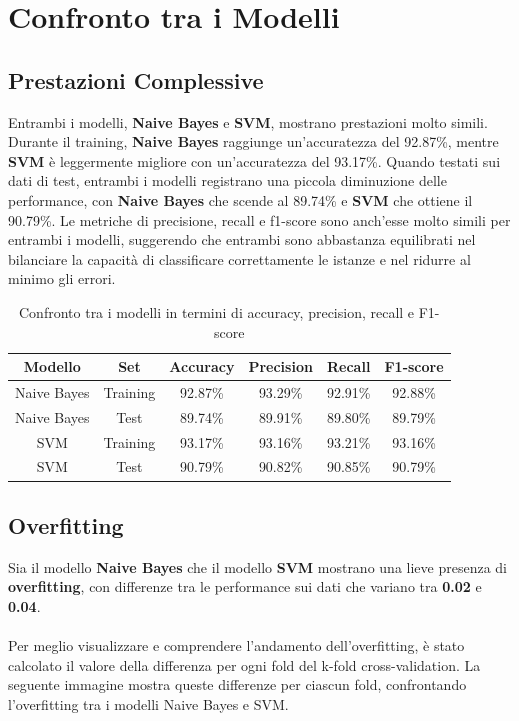 \section{Confronto tra i Modelli}

\subsection{Prestazioni Complessive}

Entrambi i modelli, \textbf{Naive Bayes} e \textbf{SVM}, mostrano prestazioni molto simili. Durante il training, \textbf{Naive Bayes} raggiunge un'accuratezza del 92.87\%, mentre \textbf{SVM} è leggermente migliore con un'accuratezza del 93.17\%. Quando testati sui dati di test, entrambi i modelli registrano una piccola diminuzione delle performance, con \textbf{Naive Bayes} che scende al 89.74\% e \textbf{SVM} che ottiene il 90.79\%. Le metriche di precisione, recall e f1-score sono anch'esse molto simili per entrambi i modelli, suggerendo che entrambi sono abbastanza equilibrati nel bilanciare la capacità di classificare correttamente le istanze e nel ridurre al minimo gli errori.

\begin{table}[H]
    \centering
    \begin{tabular}{|c|c|c|c|c|c|}
        \hline
        \textbf{Modello} & \textbf{Set} & \textbf{Accuracy} & \textbf{Precision} & \textbf{Recall} & \textbf{F1-score} \\
        \hline
        Naive Bayes & Training & 92.87\% & 93.29\% & 92.91\% & 92.88\% \\
        \hline
        Naive Bayes & Test & 89.74\% & 89.91\% & 89.80\% & 89.79\% \\
        \hline
        SVM & Training & 93.17\% & 93.16\% & 93.21\% & 93.16\% \\
        \hline
        SVM & Test & 90.79\% & 90.82\% & 90.85\% & 90.79\% \\
        \hline
    \end{tabular}
    \caption{Confronto tra i modelli in termini di accuracy, precision, recall e F1-score}
    \label{tab:confronto_metriche}
\end{table}


\subsection{Overfitting}

Sia il modello \textbf{Naive Bayes} che il modello \textbf{SVM} mostrano una lieve presenza di \textbf{overfitting}, con differenze tra le performance sui dati che variano tra \textbf{0.02} e \textbf{0.04}. \\ \\
Per meglio visualizzare e comprendere l'andamento dell'overfitting, è stato calcolato il valore della differenza per ogni fold del k-fold cross-validation. La seguente immagine mostra queste differenze per ciascun fold, confrontando l'overfitting tra i modelli Naive Bayes e SVM.

